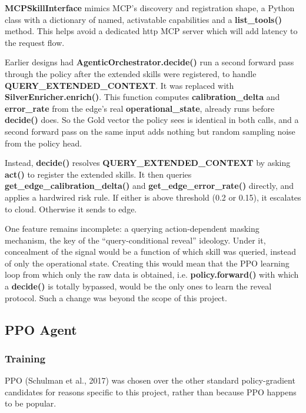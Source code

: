 \textbf{MCPSkillInterface} mimics MCP's discovery and registration shape,
 a Python class with a dictionary of named, activatable capabilities and
a \textbf{list\_tools()} method. This helps avoid a dedicated http MCP server
which will add latency to the request flow.

Earlier designs had \textbf{AgenticOrchestrator.decide()} run a second
forward pass through the policy after the extended skills were
registered, to handle \textbf{QUERY\_EXTENDED\_CONTEXT}. It was replaced
with \textbf{SilverEnricher.enrich()}. This function computes
\textbf{calibration\_delta} and \textbf{error\_rate} from the edge's
real \textbf{operational\_state}, already runs before \textbf{decide()}
does. So the Gold vector the policy sees is identical in both calls, and
a second forward pass on the same input adds nothing but random
sampling noise from the policy head.

Instead, \textbf{decide()} resolves \textbf{QUERY\_EXTENDED\_CONTEXT} by
asking \textbf{act()} to register the extended skills. It then queries
\textbf{get\_edge\_calibration\_delta()} and
\textbf{get\_edge\_error\_rate()} directly, and applies a hardwired risk
rule. If either is above threshold (0.2 or 0.15), it escalates to
cloud. Otherwise it sends to edge.

One feature remains incomplete: a querying action-dependent
masking mechanism, the key of the ``query-conditional reveal''
ideology. Under it, concealment of the signal would be a function of which
skill was queried, instead of only the operational state. Creating this would mean
that the PPO learning loop from which only the raw data is obtained, i.e.
\textbf{policy.forward()} with which a \textbf{decide()} is totally
bypassed, would be the only ones to learn the reveal protocol. Such a change
was beyond the scope of this project.

\hypertarget{ppo-agent}{%
\subsection{PPO Agent}\label{ppo-agent}}

\hypertarget{training}{%
\subsubsection{Training}\label{training}}

PPO (Schulman et al., 2017) was chosen over the other standard
policy-gradient candidates for reasons specific to this project,
rather than because PPO happens to be popular.

